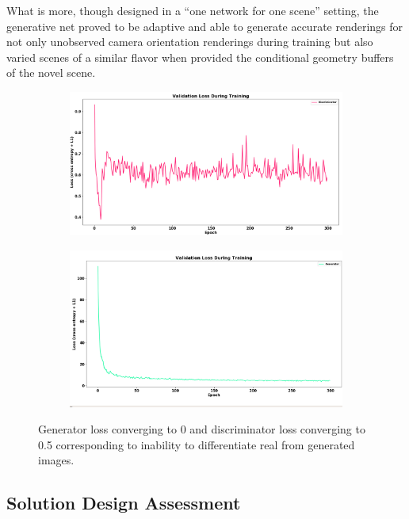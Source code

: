 What is more, though designed in a ``one network for one scene'' setting, the generative net proved to be adaptive and able to generate accurate renderings for not only unobserved camera orientation renderings during training but also varied scenes of a similar flavor when provided the conditional geometry buffers of the novel scene. 
\begin{figure}
\centering
\begin{subfigure}{.5\textwidth}
\centering
\includegraphics[width=.9\textwidth]{discrimloss.png}
\end{subfigure}
\begin{subfigure}{.5\textwidth}
\centering
\includegraphics[width=.9\textwidth]{genloss.png}
\end{subfigure}
\caption{Generator loss converging to 0 and discriminator loss converging to 0.5 corresponding to inability to differentiate real from generated images.}
\end{figure}


\subsection{Solution Design Assessment}


